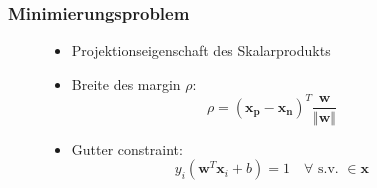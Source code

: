\begin{frame}
    \frametitle{Minimierungsproblem}

    \begin{figure}[h]
        \begin{minipage}{0.4\textwidth} 
        \end{minipage}
        \hfill
        \begin{minipage}{0.4\textwidth}
            \begin{itemize}
                \item Projektionseigenschaft des Skalarprodukts
                \item Breite des margin $\rho$:
                    \begin{equation*}
                        \rho = (\boldsymbol{x_p} - \boldsymbol{x_n})^T \frac{\boldsymbol{w}}{\Vert \boldsymbol{w} \Vert}
                    \end{equation*}
                \item Gutter constraint: 
                    \begin{equation*}
                        y_i ( \boldsymbol{w}^T \boldsymbol{x}_i + b ) = 1 \quad \forall \text{ s.v. } \in \boldsymbol{x}
                    \end{equation*}
            \end{itemize} 
        \end{minipage}


\end{figure}
\end{frame}
